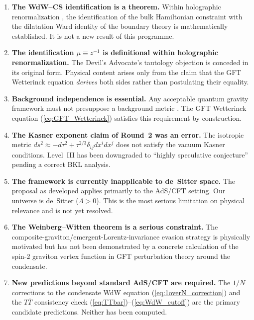 \documentclass[11pt,a4paper]{article}
\begin{document}
\begin{enumerate}

  \item \textbf{The WdW--CS identification is a theorem.}
    Within holographic renormalization \cite{skenderis2002,witten1998,maldacena1997}, the
    identification of the bulk Hamiltonian constraint with the dilatation Ward identity of
    the boundary theory is mathematically established.  It is not a new result of this
    programme.

  \item \textbf{The identification $\mu \equiv z^{-1}$ is definitional within holographic
    renormalization.}
    The Devil's Advocate's tautology objection is conceded in its original form.  Physical
    content arises only from the claim that the GFT Wetterinck equation \emph{derives}
    both sides rather than postulating their equality.

  \item \textbf{Background independence is essential.}
    Any acceptable quantum gravity framework must not presuppose a background metric
    \cite{ashtekar2004,thiemann1996,henson2006}.
    The GFT Wetterinck equation (\ref{eq:GFT_Wetterinck}) satisfies this requirement by
    construction.

  \item \textbf{The Kasner exponent claim of Round~2 was an error.}
    The isotropic metric $ds^{2}\approx -d\tau^{2}+\tau^{2/3}\delta_{ij}dx^{i}dx^{j}$ does
    not satisfy the vacuum Kasner conditions.  Level~III has been downgraded to
    ``highly speculative conjecture'' pending a correct BKL analysis.

  \item \textbf{The framework is currently inapplicable to de~Sitter space.}
    The proposal as developed applies primarily to the AdS/CFT setting.  Our universe is
    de~Sitter ($\Lambda > 0$).  This is the most serious limitation on physical relevance
    and is not yet resolved.

  \item \textbf{The Weinberg--Witten theorem is a serious constraint.}
    The composite-graviton/emergent-Lorentz-invariance evasion strategy is physically
    motivated but has not been demonstrated by a concrete calculation of the spin-2
    graviton vertex function in GFT perturbation theory around the condensate.

  \item \textbf{New predictions beyond standard AdS/CFT are required.}
    The $1/N$ corrections to the condensate WdW equation (\ref{eq:1overN_correction}) and
    the $T\bar{T}$ consistency check (\ref{eq:TTbar})--(\ref{eq:WdW_cutoff}) are the
    primary candidate predictions.  Neither has been computed.

\end{enumerate}
\end{document}
